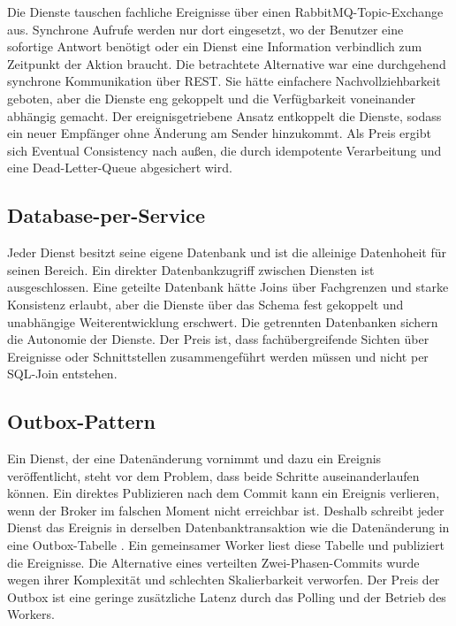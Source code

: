 Die Dienste tauschen fachliche Ereignisse über einen RabbitMQ-Topic-Exchange aus. Synchrone Aufrufe werden nur dort eingesetzt, wo der Benutzer eine sofortige Antwort benötigt oder ein Dienst eine Information verbindlich zum Zeitpunkt der Aktion braucht. Die betrachtete Alternative war eine durchgehend synchrone Kommunikation über REST. Sie hätte einfachere Nachvollziehbarkeit geboten, aber die Dienste eng gekoppelt und die Verfügbarkeit voneinander abhängig gemacht. Der ereignisgetriebene Ansatz entkoppelt die Dienste, sodass ein neuer Empfänger ohne Änderung am Sender hinzukommt. Als Preis ergibt sich Eventual Consistency nach außen, die durch idempotente Verarbeitung und eine Dead-Letter-Queue abgesichert wird.

\subsection{Database-per-Service}

Jeder Dienst besitzt seine eigene Datenbank und ist die alleinige Datenhoheit für seinen Bereich. Ein direkter Datenbankzugriff zwischen Diensten ist ausgeschlossen. Eine geteilte Datenbank hätte Joins über Fachgrenzen und starke Konsistenz erlaubt, aber die Dienste über das Schema fest gekoppelt und unabhängige Weiterentwicklung erschwert. Die getrennten Datenbanken sichern die Autonomie der Dienste. Der Preis ist, dass fachübergreifende Sichten über Ereignisse oder Schnittstellen zusammengeführt werden müssen und nicht per SQL-Join entstehen.

\subsection{Outbox-Pattern}

Ein Dienst, der eine Datenänderung vornimmt und dazu ein Ereignis veröffentlicht, steht vor dem Problem, dass beide Schritte auseinanderlaufen können. Ein direktes Publizieren nach dem Commit kann ein Ereignis verlieren, wenn der Broker im falschen Moment nicht erreichbar ist. Deshalb schreibt jeder Dienst das Ereignis in derselben Datenbanktransaktion wie die Datenänderung in eine Outbox-Tabelle \cite{richardson2018microservices}. Ein gemeinsamer Worker liest diese Tabelle und publiziert die Ereignisse. Die Alternative eines verteilten Zwei-Phasen-Commits wurde wegen ihrer Komplexität und schlechten Skalierbarkeit verworfen. Der Preis der Outbox ist eine geringe zusätzliche Latenz durch das Polling und der Betrieb des Workers.

